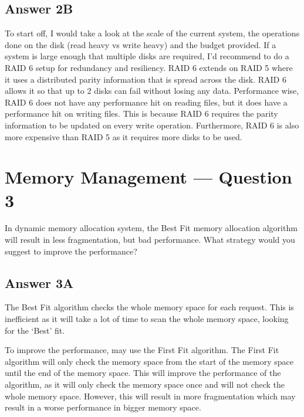 \documentclass[
  11pt, %
]{assignment}
\begin{document}
\subsection*{Answer 2B}

To start off, I would take a look at the scale of the current system, the operations done on the disk (read heavy vs write heavy) and the budget provided. If a system is large enough that multiple disks are required, I'd recommend to do a RAID 6 setup for redundancy and resiliency. RAID 6 extends on RAID 5 where it uses a distributed parity information that is spread across the disk. RAID 6 allows it so that up to 2 disks can fail without losing any data. Performance wise, RAID 6 does not have any performance hit on reading files, but it does have a performance hit on writing files. This is because RAID 6 requires the parity information to be updated on every write operation. Furthermore, RAID 6 is also more expensive than RAID 5 as it requires more disks to be used.

\section*{Memory Management --- Question 3}

\begin{problem}
In dynamic memory allocation system, the Best Fit memory allocation algorithm will result in less fragmentation, but bad performance. What strategy would you suggest to improve the performance?
\end{problem}

\subsection*{Answer 3A}

The Best Fit algorithm checks the whole memory space for each request. This is inefficient as it will take a lot of time to scan the whole memory space, looking for the `Best' fit.

To improve the performance, may use the First Fit algorithm. The First Fit algorithm will only check the memory space from the start of the memory space until the end of the memory space. This will improve the performance of the algorithm, as it will only check the memory space once and will not check the whole memory space. However, this will result in more fragmentation which may result in a worse performance in bigger memory space.
\end{document}
